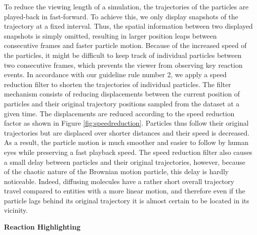 To reduce the viewing length of a simulation, the trajectories of the particles are played-back in fast-forward.
To achieve this, we only display snapshots of the trajectory at a fixed interval.
Thus, the spatial information between two displayed snapshots is simply omitted, resulting in larger position leaps between consecutive frames and faster particle motion.
Because of the increased speed of the particles, it might be difficult to keep track of individual particles between two consecutive frames, which prevents the viewer from observing key reaction events.
In accordance with our guideline rule number 2, we apply a speed reduction filter to shorten the trajectories of individual particles.
The filter mechanism consists of reducing displacements between the current position of particles and their original trajectory positions sampled from the dataset at a given time.
The displacements are reduced according to the speed reduction factor as shown in Figure \ref{fig:speedreduction}.
Particles thus follow their original trajectories but are displaced over shorter distances and their speed is decreased.
As a result, the particle motion is much smoother and easier to follow by human eyes while preserving a fast playback speed.
The speed reduction filter also causes a small delay between particles and their original trajectories, however, because of the chaotic nature of the Brownian motion particle, this delay is hardly noticeable.
Indeed, diffusing molecules have a rather short overall trajectory travel compared to entities with a more linear motion, and therefore even if the particle lags behind its original trajectory it is almost certain to be located in its vicinity.




\textbf{Reaction Highlighting}

